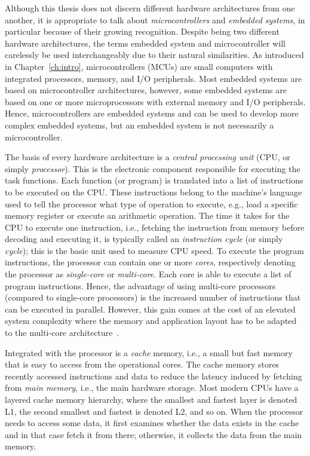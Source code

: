 Although this thesis does not discern different hardware architectures from one another, it is appropriate to talk about \emph{microcontrollers} and \emph{embedded systems}, in particular because of their growing recognition. 
Despite being two different hardware architectures, the terms embedded system and microcontroller will carelessly be used interchangeably due to their natural similarities.
As introduced in Chapter~\ref{ch:intro}, microcontrollers (MCUs) are small computers with integrated processors, memory, and I/O peripherals.
Most embedded systems are based on microcontroller architectures, however, some embedded systems are based on one or more microprocessors with external memory and I/O peripherals.
Hence, microcontrollers are embedded systems and can be used to develop more complex embedded systems, but an embedded system is not necessarily a microcontroller.

The basis of every hardware architecture is a \emph{central processing unit} (CPU, or simply \emph{processor}).
This is the electronic component responsible for executing the task functions.
Each function (or program) is translated into a list of instructions to be executed on the CPU.
These instructions belong to the machine's language used to tell the processor what type of operation to execute, e.g., load a specific memory register or execute an arithmetic operation.
The time it takes for the CPU to execute one instruction, i.e., fetching the instruction from memory before decoding and executing it, is typically called an \emph{instruction cycle} (or simply \emph{cycle}); this is the basic unit used to measure CPU speed.
To execute the program instructions, the processor can contain one or more \emph{cores}, respectively denoting the processor as \emph{single-core} or \emph{multi-core}.
Each core is able to execute a list of program instructions.
Hence, the advantage of using multi-core processors (compared to single-core processors) is the increased number of instructions that can be executed in parallel. 
However, this gain comes at the cost of an elevated system complexity where the memory and application layout has to be adapted to the multi-core architecture~\cite{Brandenburg:2011}.

Integrated with the processor is a \emph{cache} memory, i.e., a small but fast memory that is easy to access from the operational cores.
The cache memory stores recently accessed instructions and data to reduce the latency induced by fetching from \emph{main memory}, i.e., the main hardware storage.
Most modern CPUs have a layered cache memory hierarchy, where the smallest and fastest layer is denoted L1, the second smallest and fastest is denoted L2, and so on.
When the processor needs to access some data, it first examines whether the data exists in the cache and in that case fetch it from there; otherwise, it collects the data from the main memory.


